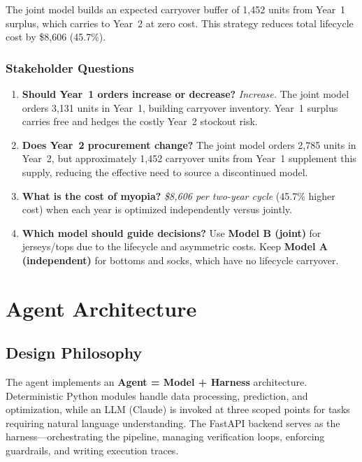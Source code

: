 \documentclass[11pt, letterpaper]{article}
\begin{document}
The joint model builds an expected carryover buffer of 1,452 units from Year~1 surplus, which carries to Year~2 at zero cost. This strategy reduces total lifecycle cost by \$8,606 (45.7\%).

\subsubsection{Stakeholder Questions}

\begin{enumerate}
    \item \textbf{Should Year~1 orders increase or decrease?} \emph{Increase.} The joint model orders 3,131 units in Year~1, building carryover inventory. Year~1 surplus carries free and hedges the costly Year~2 stockout risk.

    \item \textbf{Does Year~2 procurement change?} The joint model orders 2,785 units in Year~2, but approximately 1,452 carryover units from Year~1 supplement this supply, reducing the effective need to source a discontinued model.

    \item \textbf{What is the cost of myopia?} \emph{\$8,606 per two-year cycle} (45.7\% higher cost) when each year is optimized independently versus jointly.

    \item \textbf{Which model should guide decisions?} Use \textbf{Model B (joint)} for jerseys/tops due to the lifecycle and asymmetric costs. Keep \textbf{Model A (independent)} for bottoms and socks, which have no lifecycle carryover.
\end{enumerate}

\section{Agent Architecture}

\subsection{Design Philosophy}

The agent implements an \textbf{Agent = Model + Harness} architecture. Deterministic Python modules handle data processing, prediction, and optimization, while an LLM (Claude) is invoked at three scoped points for tasks requiring natural language understanding. The FastAPI backend serves as the harness---orchestrating the pipeline, managing verification loops, enforcing guardrails, and writing execution traces.
\end{document}
